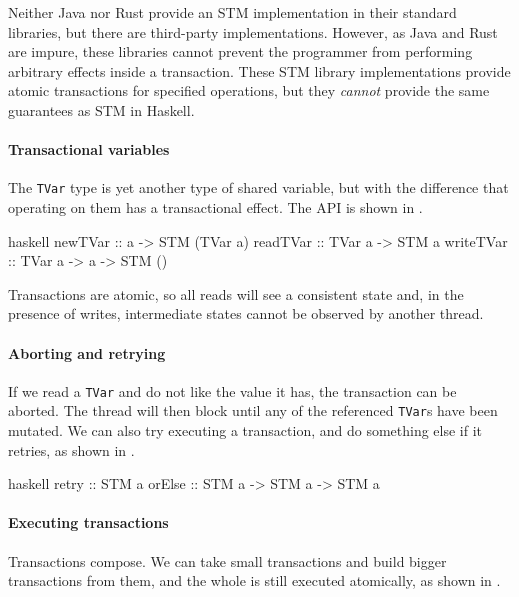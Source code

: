 Neither Java nor Rust provide an STM implementation in their standard
libraries, but there are third-party implementations.  However, as
Java and Rust are impure, these libraries cannot prevent the
programmer from performing arbitrary effects inside a transaction.
These STM library implementations provide atomic transactions for
specified operations, but they \emph{cannot} provide the same
guarantees as STM in Haskell.

\paragraph{Transactional variables}
The \verb|TVar| type is yet another type of shared variable, but with
the difference that operating on them has a transactional effect.  The
API is shown in .

\begin{listing}
\centering
\begin{cminted}{haskell}
newTVar   :: a -> STM (TVar a)
readTVar  :: TVar a -> STM a
writeTVar :: TVar a -> a -> STM ()
\end{cminted}
\caption{Transactional variables in Haskell.}\label{lst:tvars_haskell}
\end{listing}

Transactions are atomic, so all reads will see a consistent state and,
in the presence of writes, intermediate states cannot be observed by
another thread.

\paragraph{Aborting and retrying}
If we read a \verb|TVar| and do not like the value it has, the
transaction can be aborted.  The thread will then block until any of
the referenced \verb|TVar|s have been mutated.  We can also try
executing a transaction, and do something else if it retries, as shown
in .

\begin{listing}
\centering
\begin{cminted}{haskell}
retry  :: STM a
orElse :: STM a -> STM a -> STM a
\end{cminted}
\caption{Aborting and retrying transactions in Haskell.}\label{lst:orelse_haskell}
\end{listing}

\paragraph{Executing transactions}
Transactions compose.  We can take small transactions and build bigger
transactions from them, and the whole is still executed atomically, as
shown in .

